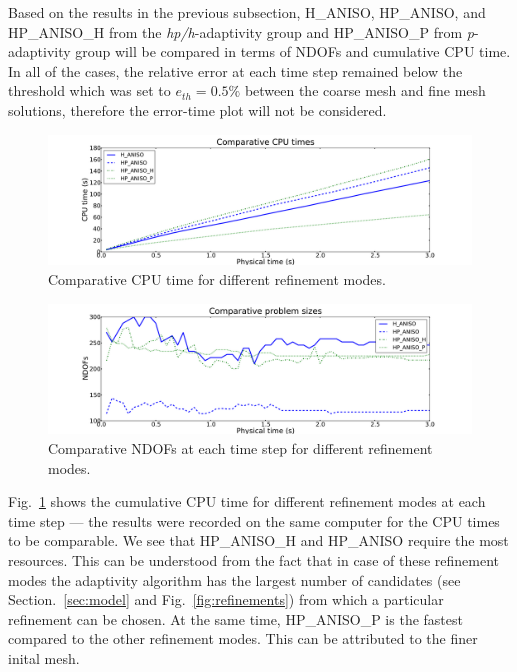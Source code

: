 Based on the results in the previous subsection, H\_ANISO, HP\_ANISO,
and HP\_ANISO\_H from the \emph{hp/h}-adaptivity group and HP\_ANISO\_P
from \emph{p}-adaptivity group will be compared
in terms of NDOFs and cumulative CPU time. 
In all of the cases, the relative 
error at each time step remained below
the threshold which was set to $e_{th}=0.5\%$ between the coarse mesh
and fine mesh solutions, therefore the error-time plot will not be considered.

\begin{figure}[!ht]
  \begin{centering}
  \includegraphics[width=\columnwidth]{cpu}
  \caption{\label{fig:cpu} Comparative CPU time for different refinement modes.}
  \end{centering}
\end{figure}

\begin{figure}[!ht]
  \begin{centering}
  \includegraphics[width=\columnwidth]{dof}
  \caption{\label{fig:dof} Comparative NDOFs at each time step for 
  different refinement modes.}
  \end{centering}
\end{figure}

Fig.~\ref{fig:cpu} shows the cumulative CPU time for different refinement 
modes at each time step --- the results were recorded on the same computer
for the CPU times to be comparable.
We see that HP\_ANISO\_H and HP\_ANISO require the most
resources. This can be understood from the fact that in case of these 
refinement modes the adaptivity algorithm has the largest number of 
candidates (see Section.~\ref{sec:model} and Fig.~\ref{fig:refinements})
from which a particular refinement can be chosen.
At the same time, HP\_ANISO\_P is the fastest compared to the other refinement modes.
This can be attributed to the finer inital mesh.

